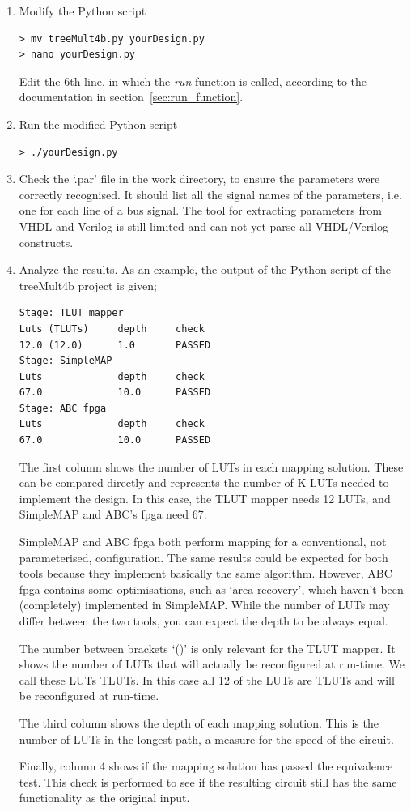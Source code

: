 \documentclass[a4paper,oneside]{memoir}
\begin{document}
\begin{enumerate}
\item Modify the Python script
\begin{lstlisting}
> mv treeMult4b.py yourDesign.py
> nano yourDesign.py
\end{lstlisting}
Edit the 6th line, in which the \emph{run} function is called, according to the documentation in section~\ref{sec:run_function}.
\item Run the modified Python script
\begin{lstlisting}
> ./yourDesign.py
\end{lstlisting}
\item \label{sec:check_par}Check the `.par' file in the work directory, to ensure the parameters were correctly recognised. It should list all the signal names of the parameters, i.e. one for each line of a bus signal. 
The tool for extracting parameters from VHDL and Verilog is still limited and can not yet parse all VHDL/Verilog constructs.
\item Analyze the results. As an example, the output of the Python script of the treeMult4b project is given;

\begin{lstlisting}
Stage: TLUT mapper
Luts (TLUTs)     depth     check
12.0 (12.0)      1.0       PASSED    
Stage: SimpleMAP
Luts             depth     check     
67.0             10.0      PASSED    
Stage: ABC fpga
Luts             depth     check     
67.0             10.0      PASSED 
\end{lstlisting}

The first column shows the number of LUTs in each mapping solution. These can be compared directly and represents the number of K-LUTs needed to implement the design. In this case, the TLUT mapper needs 12 LUTs, and SimpleMAP and ABC's fpga need 67.

SimpleMAP and ABC fpga both perform mapping for a conventional, not parameterised, configuration. The same results could be expected for both tools because they implement basically the same algorithm. However, ABC fpga contains some optimisations, such as `area recovery', which haven't been (completely) implemented in SimpleMAP. While the number of LUTs may differ between the two tools, you can expect the depth to be always equal.

The number between brackets `()' is only relevant for the TLUT mapper. It shows the number of LUTs that will actually be reconfigured at run-time. We call these LUTs TLUTs. In this case all 12 of the LUTs are TLUTs and will be reconfigured at run-time.

The third column shows the depth of each mapping solution. This is the number of LUTs in the longest path, a measure for the speed of the circuit. 

Finally, column 4 shows if the mapping solution has passed the equivalence test. This check is performed to see if the resulting circuit still has the same functionality as the original input.


\end{enumerate}
\end{document}
